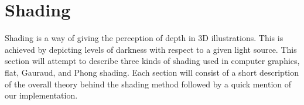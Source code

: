 \section{Shading}

Shading is a way of giving the perception of depth in 3D illustrations.
This is achieved by depicting levels of darkness with respect to a given
light source. This section will attempt to describe three kinds of shading used
in computer graphics, flat, Gauraud, and Phong shading. Each section will consist of a
short description of the overall theory behind the shading method followed by a
quick mention of our implementation.






